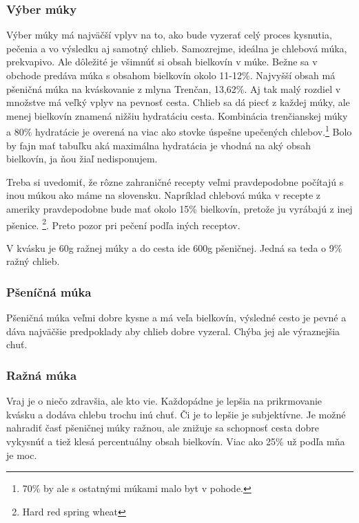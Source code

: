 \documentclass[a4paper,12pt]{article}
\begin{document}
\subsubsection{Výber múky}
Výber múky má najväčší vplyv na to, ako bude vyzerať celý proces kysnutia, pečenia a vo výsledku aj samotný chlieb. Samozrejme, ideálna je chlebová múka, prekvapivo. Ale dôležité je všimnúť si obsah bielkovín v múke. Bežne sa v obchode predáva múka s obsahom bielkovín okolo 11-12\%. Najvyšší obsah má pšeničná múka na kváskovanie z mlyna Trenčan, 13,62\%. Aj tak malý rozdiel v množstve má veľký vplyv na pevnosť cesta. Chlieb sa dá piecť z každej múky, ale menej bielkovín znamená nižšiu hydratáciu cesta. Kombinácia trenčianskej múky a 80\% hydratácie je overená na viac ako stovke úspešne upečených chlebov.\footnote{70\% by ale s ostatnými múkami malo byt v pohode.} Bolo by fajn mať tabuľku aká maximálna hydratácia je vhodná na aký obsah bielkovín, ja ňou žiaľ nedisponujem.

Treba si uvedomiť, že rôzne zahraničné recepty veľmi pravdepodobne počítajú s inou múkou ako máme na slovensku. Napríklad chlebová múka v recepte z ameriky pravdepodobne bude mať okolo 15\% bielkovín, pretože ju vyrábajú z inej pšenice. \footnote{Hard red spring wheat}. Preto pozor pri pečení podľa iných receptov.

V kvásku je 60g ražnej múky a do cesta ide 600g pšeničnej. Jedná sa teda o 9\% ražný chlieb.


\subsubsection{Pšeníčná múka}
Pšeničná múka veľmi dobre kysne a má veľa bielkovín, výsledné cesto je pevné a dáva najväčšie predpoklady aby chlieb dobre vyzeral. Chýba jej ale výraznejšia chuť.
\subsubsection{Ražná múka}
Vraj je o niečo zdravšia, ale kto vie. Každopádne je lepšia na prikrmovanie kvásku a dodáva chlebu trochu inú chuť. Či je to lepšie je subjektívne. Je možné  nahradiť časť pšeničnej múky ražnou, ale znižuje sa schopnosť cesta dobre vykysnúť a tiež klesá percentuálny obsah bielkovín. Viac ako 25\% už podľa mňa je moc.
\end{document}
